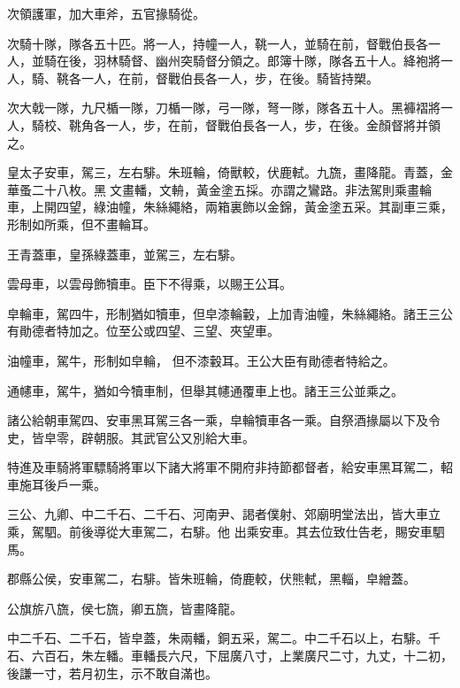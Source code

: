 \begin{pinyinscope}
 次領護軍，加大車斧，五官掾騎從。



 次騎十隊，隊各五十匹。將一人，持幢一人，鞉一人，並騎在前，督戰伯長各一人，並騎在後，羽林騎督、幽州突騎督分領之。郎簿十隊，隊各五十人。絳袍將一人，騎、鞉各一人，在前，督戰伯長各一人，步，在後。騎皆持槊。



 次大戟一隊，九尺楯一隊，刀楯一隊，弓一隊，弩一隊，隊各五十人。黑褲褶將一人，騎校、鞉角各一人，步，在前，督戰伯長各一人，步，在後。金顏督將并領之。



 皇太子安車，駕三，左右騑。朱班輪，倚獸較，伏鹿軾。九旒，畫降龍。青蓋，金華蚤二十八枚。黑𣝛文畫轓，文輈，黃金塗五採。亦謂之鸞路。非法駕則乘畫輪車，上開四望，綠油幢，朱絲繩絡，兩箱裏飾以金錦，黃金塗五采。其副車三乘，形制如所乘，但不畫輪耳。



 王青蓋車，皇孫綠蓋車，並駕三，左右騑。



 雲母車，以雲母飾犢車。臣下不得乘，以賜王公耳。



 皁輪車，駕四牛，形制猶如犢車，但皁漆輪轂，上加青油幢，朱絲繩絡。諸王三公有勛德者特加之。位至公或四望、三望、夾望車。



 油幢車，駕牛，形制如皁輪，
 但不漆轂耳。王公大臣有勛德者特給之。



 通幰車，駕牛，猶如今犢車制，但舉其幰通覆車上也。諸王三公並乘之。



 諸公給朝車駕四、安車黑耳駕三各一乘，皁輪犢車各一乘。自祭酒掾屬以下及令史，皆皁零，辟朝服。其武官公又別給大車。



 特進及車騎將軍驃騎將軍以下諸大將軍不開府非持節都督者，給安車黑耳駕二，軺車施耳後戶一乘。



 三公、九卿、中二千石、二千石、河南尹、謁者僕射、郊廟明堂法出，皆大車立乘，駕駟。前後導從大車駕二，右騑。他
 出乘安車。其去位致仕告老，賜安車駟馬。



 郡縣公侯，安車駕二，右騑。皆朱班輪，倚鹿較，伏熊軾，黑輜，皁繒蓋。



 公旗旂八旒，侯七旒，卿五旒，皆畫降龍。



 中二千石、二千石，皆皁蓋，朱兩轓，銅五采，駕二。中二千石以上，右騑。千石、六百石，朱左轓。車轓長六尺，下屈廣八寸，上業廣尺二寸，九丈，十二初，後謙一寸，若月初生，示不敢自滿也。




\end{pinyinscope}
